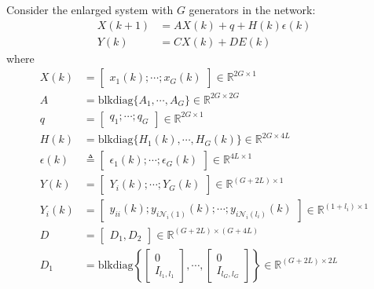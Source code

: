 Consider the enlarged system with $G$ generators in the network:
\begin{equation}\label{eq:state_space_N}
\begin{aligned}
X(k+1) & = AX(k) + q + H(k) \epsilon(k) \\
Y(k) & = CX(k) + DE(k)
\end{aligned}
\end{equation}
where
\begin{equation}
\begin{aligned}
X(k) &= \begin{bmatrix} x_1(k); \cdots; x_G(k) \end{bmatrix} \in \mathbb{R}^{2G\times 1} \\
A &= \text{blkdiag} \{ A_1, \cdots, A_G\} \in \mathbb{R}^{2G\times 2G}\\
q &= \begin{bmatrix} q_1; \cdots; q_G \end{bmatrix} \in \mathbb{R}^{2G\times 1}\\
H(k)& = \text{blkdiag} \{ H_1(k), \cdots, H_G(k) \}  \in \mathbb{R}^{2G\times 4L }\\
\epsilon(k) &\triangleq \begin{bmatrix} \epsilon_1(k); \cdots; \epsilon_G(k)\end{bmatrix} \in \mathbb{R}^{4L \times 1}  \\
Y(k) &= \begin{bmatrix} Y_{i}(k); \cdots; Y_G(k) \end{bmatrix} \in \mathbb{R}^{(G+2L) \times 1} \\
Y_i(k) & = \begin{bmatrix} y_{ii}(k); y_{i\mathcal{N}_i(1)}(k); \cdots; y_{i\mathcal{N}_i(l_i)}(k) \end{bmatrix} \in \mathbb{R}^{(1+l_i) \times 1} \\
D &= \begin{bmatrix} D_1, D_2 \end{bmatrix}  \in \mathbb{R}^{(G+2L)\times (G+4L)}\\
D_1 &= \text{blkdiag} \left \{ \begin{bmatrix} 0 \\ I_{l_1, l_1} \end{bmatrix}, \cdots, \begin{bmatrix} 0 \\ I_{l_G, l_G} \end{bmatrix} \right \} \in \mathbb{R}^{(G+2L) \times 2L} \\

\end{aligned}
\end{equation}
